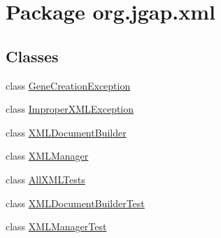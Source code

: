 \hypertarget{namespaceorg_1_1jgap_1_1xml}{\section{Package org.\-jgap.\-xml}
\label{namespaceorg_1_1jgap_1_1xml}
}
\subsection*{Classes}
\begin{DoxyCompactItemize}
\item 
class \hyperlink{classorg_1_1jgap_1_1xml_1_1_gene_creation_exception}{Gene\-Creation\-Exception}
\item 
class \hyperlink{classorg_1_1jgap_1_1xml_1_1_improper_x_m_l_exception}{Improper\-X\-M\-L\-Exception}
\item 
class \hyperlink{classorg_1_1jgap_1_1xml_1_1_x_m_l_document_builder}{X\-M\-L\-Document\-Builder}
\item 
class \hyperlink{classorg_1_1jgap_1_1xml_1_1_x_m_l_manager}{X\-M\-L\-Manager}
\item 
class \hyperlink{classorg_1_1jgap_1_1xml_1_1_all_x_m_l_tests}{All\-X\-M\-L\-Tests}
\item 
class \hyperlink{classorg_1_1jgap_1_1xml_1_1_x_m_l_document_builder_test}{X\-M\-L\-Document\-Builder\-Test}
\item 
class \hyperlink{classorg_1_1jgap_1_1xml_1_1_x_m_l_manager_test}{X\-M\-L\-Manager\-Test}
\end{DoxyCompactItemize}
